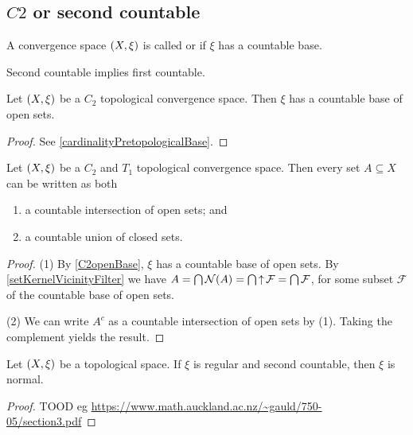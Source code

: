 \subsection{$C2$ or second countable}
\begin{definition}
A convergence space $\left( X, \xi \right)$ is called  or  if $\xi$ has a countable base.
\end{definition}

\begin{lemma}
Second countable implies first countable.
\end{lemma}

\begin{lemma} \label{C2openBase}
Let $\left( X,\xi \right)$ be a $C_2$ topological convergence space. Then $\xi$ has a countable base of open sets.
\end{lemma}
\begin{proof}
See \ref{cardinalityPretopologicalBase}.
\end{proof}

\begin{lemma} \label{AnySetCountableIntersectionOfOpenSets}
Let $\left( X,\xi \right)$ be a $C_2$ and $T_1$ topological convergence space. Then every set $A\subseteq X$ can be written as both
\begin{enumerate}
\item a countable intersection of open sets; and
\item a countable union of closed sets.
\end{enumerate}
\end{lemma}
\begin{proof}
(1) By \ref{C2openBase}, $\xi$ has a countable base of open sets. By \ref{setKernelVicinityFilter} we have $A = \bigcap \operatorname{\mathcal{N}}(A) = \bigcap \operatorname{\uparrow} \mathcal{F} = \bigcap \mathcal{F}$, for some subset $\mathcal{F}$ of the countable base of open sets.

(2) We can write $A^c$ as a countable intersection of open sets by (1). Taking the complement yields the result.
\end{proof}


\begin{proposition} \label{countableRegularityImpliesNormality}
Let $\left( X,\xi \right)$ be a topological space. If $\xi$ is regular and second countable, then $\xi$ is normal.
\end{proposition}
\begin{proof}
TOOD eg \url{https://www.math.auckland.ac.nz/~gauld/750-05/section3.pdf}
\end{proof}

